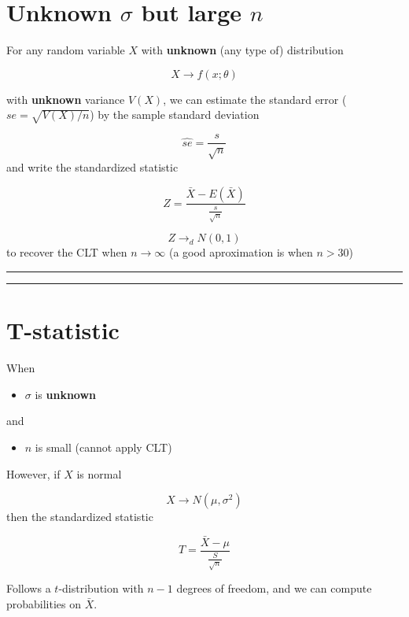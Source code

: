 \documentclass[
]{book}
\providecommand{\tightlist}{%
  \setlength{\itemsep}{0pt}\setlength{\parskip}{0pt}}
\begin{document}
\hypertarget{unknown-sigma-but-large-n}{%
\section{\texorpdfstring{Unknown \(\sigma\) but large \(n\)}{Unknown \textbackslash sigma but large n}}\label{unknown-sigma-but-large-n}}

For any random variable \(X\) with \textbf{unknown} (any type of) distribution

\[X \rightarrow f(x; \theta)\]

with \textbf{unknown} variance \(V(X)\), we can estimate the standard error (\(se=\sqrt{V(X)/n}\)) by the sample standard deviation

\[\hat{se}=\frac{s}{\sqrt{n}}\] and write the standardized statistic

\[Z=\frac{\bar{X}-E(\bar{X})}{\frac{s}{\sqrt{n}}} \]

\[Z \rightarrow_d N(0,1)\] to recover the CLT when \(n\rightarrow \infty\) (a good aproximation is when \(n>30\))

\begin{center}\rule{0.5\linewidth}{0.5pt}\end{center}

\begin{center}\rule{0.5\linewidth}{0.5pt}\end{center}

\hypertarget{t-statistic}{%
\section{T-statistic}\label{t-statistic}}

When

\begin{itemize}
\tightlist
\item
  \(\sigma\) is \textbf{unknown}
\end{itemize}

and

\begin{itemize}
\tightlist
\item
  \(n\) is small (cannot apply CLT)
\end{itemize}

However, if \(X\) is normal

\[X \rightarrow N(\mu, \sigma^2)\] then the standardized statistic

\[T=\frac{\bar{X}-\mu}{\frac{S}{\sqrt{n}}} \]

Follows a \(t\)-distribution with \(n-1\) degrees of freedom, and we can compute probabilities on \(\bar{X}\).
\end{document}
